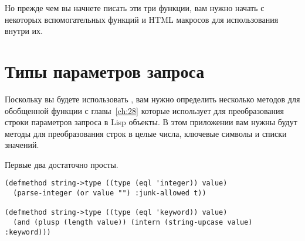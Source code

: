 Но прежде чем вы начнете писать эти три функции, вам нужно начать с некоторых
вспомогательных функций и HTML макросов для использования внутри их.

\section{Типы параметров запроса}

Поскольку вы будете использовать , вам нужно определить
несколько методов для обобщенной функции  с главы~\ref{ch:28} которые
 использует для преобразования строки параметров запроса в Lisp
объекты. В этом приложении вам нужны будут методы для преобразования строк в целые числа,
ключевые символы и списки значений.

Первые два достаточно просты.

\begin{lstlisting}
(defmethod string->type ((type (eql 'integer)) value)
  (parse-integer (or value "") :junk-allowed t))

(defmethod string->type ((type (eql 'keyword)) value)
  (and (plusp (length value)) (intern (string-upcase value) :keyword)))
\end{lstlisting}

